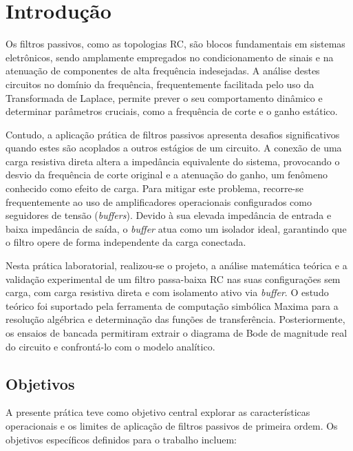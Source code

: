 \chapter{Introdução}

Os filtros passivos, como as topologias RC, são blocos fundamentais em sistemas eletrônicos, sendo amplamente empregados no condicionamento de sinais e na atenuação de componentes de alta frequência indesejadas. A análise destes circuitos no domínio da frequência, frequentemente facilitada pelo uso da Transformada de Laplace, permite prever o seu comportamento dinâmico e determinar parâmetros cruciais, como a frequência de corte e o ganho estático.

Contudo, a aplicação prática de filtros passivos apresenta desafios significativos quando estes são acoplados a outros estágios de um circuito. A conexão de uma carga resistiva direta altera a impedância equivalente do sistema, provocando o desvio da frequência de corte original e a atenuação do ganho, um fenômeno conhecido como efeito de carga. Para mitigar este problema, recorre-se frequentemente ao uso de amplificadores operacionais configurados como seguidores de tensão (\textit{buffers}). Devido à sua elevada impedância de entrada e baixa impedância de saída, o \textit{buffer} atua como um isolador ideal, garantindo que o filtro opere de forma independente da carga conectada.

Nesta prática laboratorial, realizou-se o projeto, a análise matemática teórica e a validação experimental de um filtro passa-baixa RC nas suas configurações sem carga, com carga resistiva direta e com isolamento ativo via \textit{buffer}. O estudo teórico foi suportado pela ferramenta de computação simbólica Maxima \cite{maxima} para a resolução algébrica e determinação das funções de transferência. Posteriormente, os ensaios de bancada permitiram extrair o diagrama de Bode de magnitude real do circuito e confrontá-lo com o modelo analítico.

\section{Objetivos}

A presente prática teve como objetivo central explorar as características operacionais e os limites de aplicação de filtros passivos de primeira ordem. Os objetivos específicos definidos para o trabalho incluem:

